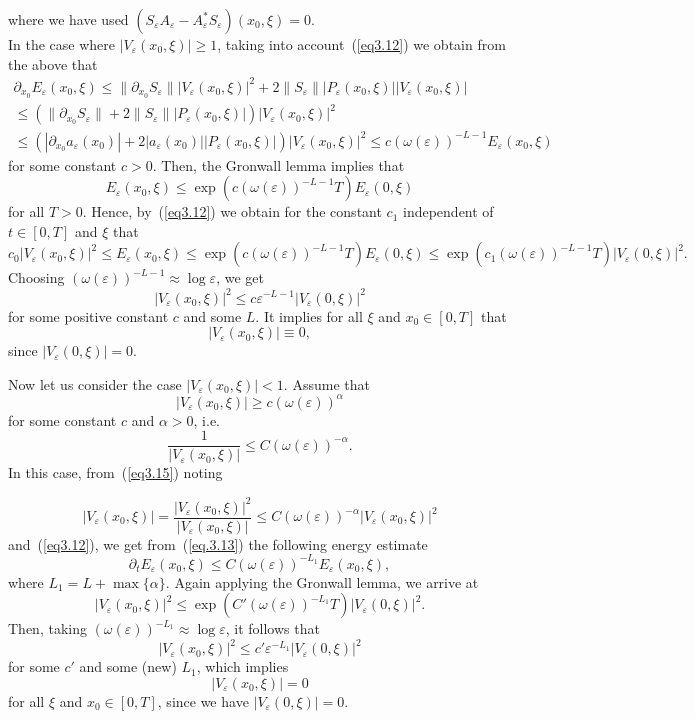 \documentclass[12pt]{amsart}
\theoremstyle{definition}
\begin{document}
where we have used $(S_\varepsilon A_\varepsilon - A^*_\varepsilon S_\varepsilon)(x_0, \xi) = 0$. \\
In the case where $|V_\varepsilon(x_0, \xi)| \geq 1$, taking into account~(\ref{eq3.12}) we obtain from the above that
\begin{gather*}
\partial_{x_0} E_\varepsilon(x_0, \xi)\leq \|\partial_{x_0} S_\varepsilon\| |V_\varepsilon(x_0, \xi)|^2 + 2 \|S_\varepsilon\| |P_\varepsilon(x_0, \xi)| |V_\varepsilon(x_0, \xi)|\\
 \leq (\|\partial_{x_0} S_\varepsilon\| + 2 \|S_\varepsilon\| |P_\varepsilon(x_0, \xi)|) |V_\varepsilon(x_0, \xi)|^2 \\
\leq (|\partial_{x_0} a_\varepsilon(x_0)| + 2 |a_\varepsilon(x_0)| |P_\varepsilon(x_0, \xi)|) |V_\varepsilon(x_0, \xi)|^2 \leq c (\omega(\varepsilon))^{-L-1} E_\varepsilon(x_0, \xi)
\end{gather*}
for some constant $c > 0$. Then, the Gronwall lemma implies that
\[
E_\varepsilon(x_0, \xi) \leq \exp(c (\omega(\varepsilon))^{-L-1} T) E_\varepsilon(0, \xi)
\]
for all $T > 0$. Hence, by~(\ref{eq3.12}) we obtain for the constant $c_1$ independent of $t \in [0, T]$ and $\xi$ that
\[
c_0 |V_\varepsilon(x_0, \xi)|^2 \leq E_\varepsilon(x_0, \xi)\leq \exp(c (\omega(\varepsilon))^{-L-1} T) E_\varepsilon(0, \xi) \leq \exp(c_1 (\omega(\varepsilon))^{-L-1} T) |V_\varepsilon(0, \xi)|^2.
\]
Choosing $(\omega(\varepsilon))^{-L-1} \approx \log \varepsilon$, we get
\[
|V_\varepsilon(x_0, \xi)|^2 \leq c \varepsilon^{-L-1} |V_\varepsilon(0, \xi)|^2
\]
for some positive constant $c$ and some $L$. It implies for all $\xi$ and $x_0 \in [0, T]$ that
\[
|V_\varepsilon(x_0, \xi)| \equiv 0,
\]
since $|V_\varepsilon(0, \xi)| = 0$.

Now let us consider the case $|V_\varepsilon(x_0, \xi)| < 1$. Assume that
\[
|V_\varepsilon(x_0, \xi)| \geq c (\omega(\varepsilon))^\alpha
\]
for some constant $c$ and $\alpha > 0$, i.e.
\begin{equation}
\label{eq3.15}
\frac{1}{|V_\varepsilon(x_0, \xi)|} \leq C (\omega(\varepsilon))^{-\alpha}.
\end{equation}
In this case, from~(\ref{eq3.15}) noting



\[
|V_\varepsilon(x_0, \xi)| = \frac{|V_\varepsilon(x_0, \xi)|^2}{|V_\varepsilon(x_0, \xi)|} \leq C (\omega(\varepsilon))^{-\alpha} |V_\varepsilon(x_0, \xi)|^2
\]
and~(\ref{eq3.12}), we get from~(\ref{eq.3.13}) the following energy estimate
\[
\partial_t E_\varepsilon(x_0, \xi) \leq C (\omega(\varepsilon))^{-L_1} E_\varepsilon(x_0, \xi),
\]
where $L_1 = L + \max\{\alpha\}$. Again applying the Gronwall lemma, we arrive at
\[
|V_\varepsilon(x_0, \xi)|^2 \leq \exp(C' (\omega(\varepsilon))^{-L_1} T) |V_\varepsilon(0, \xi)|^2.
\]
Then, taking $(\omega(\varepsilon))^{-L_1} \approx \log \varepsilon$, it follows that
\[
|V_\varepsilon(x_0, \xi)|^2 \leq c' \varepsilon^{-L_1} |V_\varepsilon(0, \xi)|^2
\]
for some $c'$ and some (new) $L_1$, which implies
\[
|V_\varepsilon(x_0, \xi)| = 0
\]
for all $\xi$ and $x_0 \in [0, T]$, since we have $|V_\varepsilon(0, \xi)| = 0$.
\end{document}
